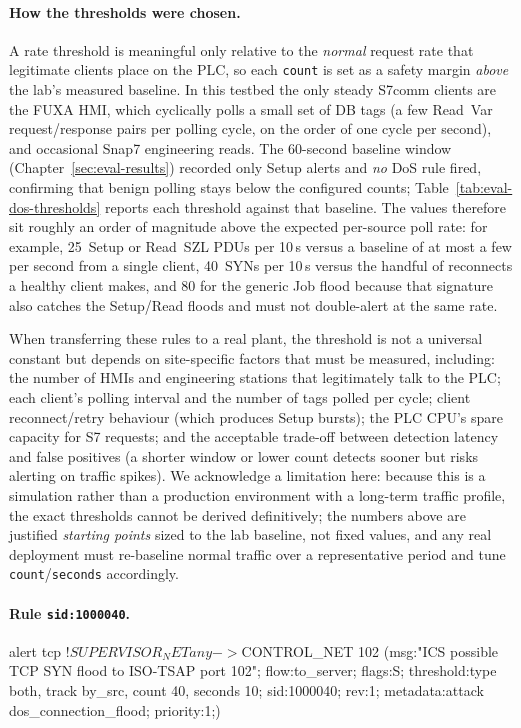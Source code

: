\documentclass[../main.tex]{subfiles}
\begin{document}
\paragraph{How the thresholds were chosen.}
A rate threshold is meaningful only relative to the \emph{normal} request rate that legitimate clients place on the PLC, so each \texttt{count} is set as a safety margin \emph{above} the lab's measured baseline. In this testbed the only steady S7comm clients are the FUXA HMI, which cyclically polls a small set of DB tags (a few Read~Var request/response pairs per polling cycle, on the order of one cycle per second), and occasional Snap7 engineering reads. The 60-second baseline window (Chapter~\ref{sec:eval-results}) recorded only Setup alerts and \emph{no} DoS rule fired, confirming that benign polling stays below the configured counts; Table~\ref{tab:eval-dos-thresholds} reports each threshold against that baseline. The values therefore sit roughly an order of magnitude above the expected per-source poll rate: for example, 25~Setup or Read~SZL PDUs per 10\,s versus a baseline of at most a few per second from a single client, 40~SYNs per 10\,s versus the handful of reconnects a healthy client makes, and 80 for the generic Job flood because that signature also catches the Setup/Read floods and must not double-alert at the same rate.

When transferring these rules to a real plant, the threshold is not a universal constant but depends on site-specific factors that must be measured, including: the number of HMIs and engineering stations that legitimately talk to the PLC; each client's polling interval and the number of tags polled per cycle; client reconnect/retry behaviour (which produces Setup bursts); the PLC CPU's spare capacity for S7 requests; and the acceptable trade-off between detection latency and false positives (a shorter window or lower count detects sooner but risks alerting on traffic spikes). We acknowledge a limitation here: because this is a simulation rather than a production environment with a long-term traffic profile, the exact thresholds cannot be derived definitively; the numbers above are justified \emph{starting points} sized to the lab baseline, not fixed values, and any real deployment must re-baseline normal traffic over a representative period and tune \texttt{count}/\texttt{seconds} accordingly.

\paragraph{Rule \texttt{sid:1000040}.}
\begin{packetdump}
alert tcp !$SUPERVISOR_NET any -> $CONTROL_NET 102 (msg:"ICS possible TCP SYN flood to ISO-TSAP port 102";
  flow:to_server; flags:S;
  threshold:type both, track by_src, count 40, seconds 10; sid:1000040; rev:1;
  metadata:attack dos_connection_flood; priority:1;)
\end{packetdump}
\end{document}
